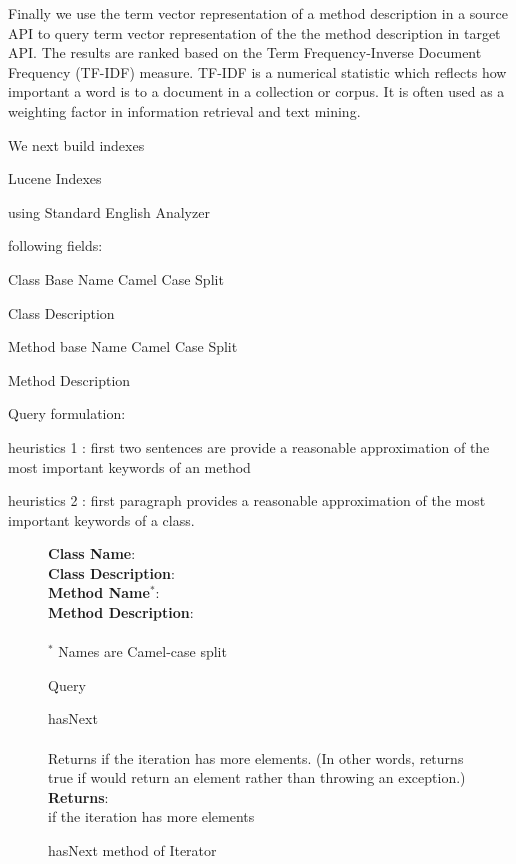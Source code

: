 Finally we use the term vector representation of a method description in a source API to query term vector representation of the the method description in target API. The results are ranked based on the Term Frequency-Inverse Document Frequency (TF-IDF) measure. TF-IDF is a numerical statistic which reflects how important a word is to a document in a collection or corpus. It is often used as a weighting factor in information retrieval and text mining.


We next build indexes 

Lucene Indexes 

using Standard English Analyzer

following fields:

Class Base Name Camel Case Split

Class Description

Method base Name Camel Case Split

Method Description


Query formulation:

heuristics 1 : first two sentences are provide a reasonable approximation of the most important keywords of an method

heuristics 2 : first paragraph provides a reasonable approximation of the most important keywords of a class.

\begin{figure}
	\begin{framed}	
		\textbf{Class Name}: \\
		\textbf{Class Description}: \\
		\textbf{Method Name}$^*$: \\
		\textbf{Method Description}: \\ \\
		$^*$ Names are Camel-case split
	\end{framed}
	\caption{Query}
	\label{fig:hasNextJavaQuery}
\end{figure}


\begin{figure}
	\begin{framed}
		{\LARGE hasNext}\\
		\CodeIn{boolean hasNext()}\\
		Returns  if the iteration has more elements. (In other words, returns true if  would return an element rather than throwing an exception.)\\
		\textbf{Returns}:\\
		 if the iteration has more elements
	\end{framed}
	\caption{hasNext method of Iterator}
	\label{fig:hasNextJavadoc}
\end{figure}
